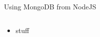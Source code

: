 \begin{frame}{Using MongoDB from NodeJS}
  \begin{columns}[onlytextwidth]
    \begin{column}{0.6\textwidth}
      \begin{itemize}
          \item stuff
      \end{itemize}
    \end{column}
    \begin{column}[t]{0.4\textwidth}
    \end{column}
  \end{columns}
\end{frame}
